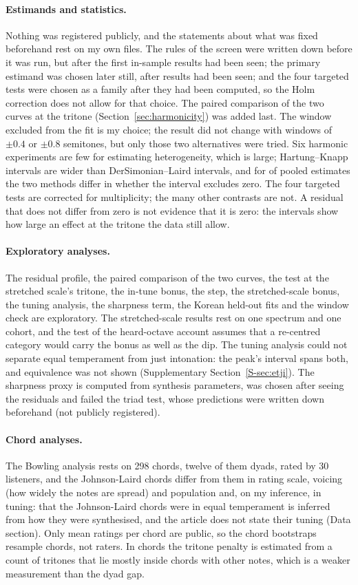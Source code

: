 \documentclass[11pt,a4paper]{article}
\begin{document}
\paragraph{Estimands and statistics.}
Nothing was registered publicly, and the statements about what was fixed beforehand rest on
my own files. The rules of the screen were written down before it was run, but after the
first in-sample results had been seen; the primary estimand was chosen later still, after
results had been seen; and the four targeted tests were chosen as a family after they had
been computed, so the Holm correction does not allow for that choice. The paired comparison of the two curves at the tritone
(Section~\ref{sec:harmonicity}) was added last. The window excluded from the fit is my choice; the result did
not change with windows of $\pm0.4$ or $\pm0.8$ semitones, but only those two alternatives
were tried. Six harmonic experiments are few for estimating heterogeneity, which is large;
Hartung--Knapp intervals are wider than DerSimonian--Laird intervals, and for
\reNflip{} of \reNest{} pooled estimates the two methods differ in whether the interval excludes zero. The four targeted
tests are corrected for multiplicity; the many other contrasts are not. A residual that does
not differ from zero is not evidence that it is zero: the intervals show how large an effect
at the tritone the data still allow.

\paragraph{Exploratory analyses.}
The residual profile, the paired comparison of the two curves, the test at the stretched scale's tritone, the in-tune bonus, the step, the stretched-scale bonus, the tuning
analysis, the sharpness term, the Korean held-out fits and the window check are exploratory.
The stretched-scale results rest on one spectrum and one cohort, and the test of the
heard-octave account assumes that a re-centred category would carry the bonus as well as the
dip. The tuning analysis could not separate equal temperament from just intonation: the
peak's interval spans both, and equivalence was not shown (Supplementary
Section~\ref{S-sec:etji}). The sharpness proxy is computed from synthesis parameters, was
chosen after seeing the residuals and failed the triad test, whose predictions were
written down beforehand (not publicly registered).

\paragraph{Chord analyses.}
The Bowling analysis rests on 298 chords, twelve of them dyads, rated by 30 listeners, and the
Johnson-Laird chords differ from them in rating scale, voicing (how widely the notes are
spread) and population and, on my inference,
in tuning: that the Johnson-Laird chords were in equal temperament is inferred from how they
were synthesised, and the article does not state their tuning (Data section). Only mean ratings
per chord are public, so the chord bootstraps resample chords, not raters. In chords the
tritone penalty is estimated from a count of tritones that lie mostly inside chords with other notes, which
is a weaker measurement than the dyad gap.
\end{document}
